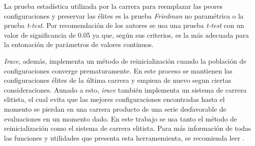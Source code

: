 

La prueba estadística utilizada por la carrera para reemplazar las peores configuraciones y preservar las élites es la prueba \emph{Friedman} no paramétrica o la prueba \emph{t-test}. Por recomendación de los autores se usa una prueba \emph{t-test} con un valor de significancia de 0.05 ya que, según sus criterios, es la más adecuada para la entonación de parámetros de valores continuos.

\emph{Irace}, además, implementa un método de reinicialización cuando la población de configuraciones converge prematuramente. En este proceso se mantienen las configuraciones élites de la última carrera y empieza de nuevo segun ciertas consideraciones. Aunado a esto, \emph{irace} también implementa un sistema de carrera elitista, el cual evita que las mejores configuraciones encontradas hasta el momento se pierdan en una carrera producto de una serie desfavorable de evaluaciones en un momento dado. En este trabajo se usa tanto el método de reinicialización como el sistema de carrera elitista. Para más información de todas las funciones y utilidades que presenta esta herramemienta, se recomienda leer \cite{lopez2016irace}.

